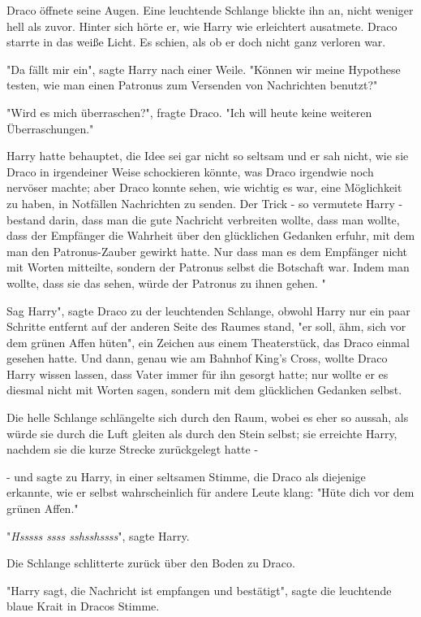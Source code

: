 {Draco öffnete seine Augen. Eine leuchtende Schlange blickte ihn an, nicht weniger hell als zuvor. Hinter sich hörte er, wie Harry wie erleichtert ausatmete. Draco starrte in das weiße Licht. Es schien, als ob er doch nicht ganz verloren war.

"Da fällt mir ein", sagte Harry nach einer Weile. "Können wir meine Hypothese testen, wie man einen Patronus zum Versenden von Nachrichten benutzt?"

"Wird es mich überraschen?", fragte Draco. "Ich will heute keine weiteren Überraschungen."

Harry hatte behauptet, die Idee sei gar nicht so seltsam und er sah nicht, wie sie Draco in irgendeiner Weise schockieren könnte, was Draco irgendwie noch nervöser machte; aber Draco konnte sehen, wie wichtig es war, eine Möglichkeit zu haben, in Notfällen Nachrichten zu senden. Der Trick - so vermutete Harry - bestand darin, dass man die gute Nachricht verbreiten wollte, dass man wollte, dass der Empfänger die Wahrheit über den glücklichen Gedanken erfuhr, mit dem man den Patronus-Zauber gewirkt hatte. Nur dass man es dem Empfänger nicht mit Worten mitteilte, sondern der Patronus selbst die Botschaft war. Indem man wollte, dass sie das sehen, würde der Patronus zu ihnen gehen. "

Sag Harry", sagte Draco zu der leuchtenden Schlange, obwohl Harry nur ein paar Schritte entfernt auf der anderen Seite des Raumes stand, "er soll, ähm, sich vor dem grünen Affen hüten", ein Zeichen aus einem Theaterstück, das Draco einmal gesehen hatte. Und dann, genau wie am Bahnhof King's Cross, wollte Draco Harry wissen lassen, dass Vater immer für ihn gesorgt hatte; nur wollte er es diesmal nicht mit Worten sagen, sondern mit dem glücklichen Gedanken selbst.

Die helle Schlange schlängelte sich durch den Raum, wobei es eher so aussah, als würde sie durch die Luft gleiten als durch den Stein selbst; sie erreichte Harry, nachdem sie die kurze Strecke zurückgelegt hatte -

- und sagte zu Harry, in einer seltsamen Stimme, die Draco als diejenige erkannte, wie er selbst wahrscheinlich für andere Leute klang: "Hüte dich vor dem grünen Affen."

"\emph{Hsssss ssss sshsshssss}", sagte Harry.

Die Schlange schlitterte zurück über den Boden zu Draco.

"Harry sagt, die Nachricht ist empfangen und bestätigt", sagte die leuchtende blaue Krait in Dracos Stimme.

}
